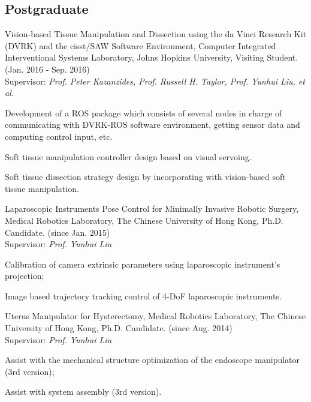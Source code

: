 \documentclass[10pt,letterpaper]{article}
\renewenvironment{itemize}{
  \begin{list}{}{
    \setlength{\leftmargin}{1.5em}
    \setlength{\itemsep}{0.25em}
    \setlength{\parskip}{0pt}
    \setlength{\parsep}{0.25em}
  }
}{
  \end{list}
}
\begin{document}
\subsection*{Postgraduate}
\begin{itemize}
\item Vision-based Tissue Manipulation and Dissection using the da Vinci Research Kit (DVRK) and the cisst/SAW Software Environment, Computer Integrated Interventional Systems Laboratory, Johns Hopkins University, Visiting Student. (Jan. 2016 - Sep. 2016) \\
  Supervisor: \textit{Prof. Peter Kazanzides, Prof. Russell H. Taylor, Prof. Yunhui Liu, et al.}
  \begin{itemize}
  \item Development of a ROS package which consists of several nodes in charge of communicating with DVRK-ROS software environment, getting sensor data and computing control input, etc.
  \item Soft tissue manipulation controller design based on visual servoing.
  \item Soft tissue dissection strategy design by incorporating with vision-based soft tissue manipulation. 
  \end{itemize}

\item Laparoscopic Instruments Pose Control for Minimally Invasive Robotic Surgery, Medical Robotics Laboratory, The Chinese University of Hong Kong, Ph.D. Candidate. (since Jan. 2015) \\
  Supervisor: \textit{Prof. Yunhui Liu}
  \begin{itemize}
  \item Calibration of camera extrinsic parameters using laparoscopic instrument's projection;
  \item Image based trajectory tracking control of 4-DoF laparoscopic instruments.
  \end{itemize}

\item Uterus Manipulator for Hysterectomy, Medical Robotics Laboratory, The Chinese University of Hong Kong, Ph.D. Candidate. (since Aug. 2014) \\
  Supervisor: \textit{Prof. Yunhui Liu}
  \begin{itemize}
  \item Assist with the mechanical structure optimization of the endoscope manipulator (3rd version);
  \item Assist with system assembly (3rd version).
  \end{itemize}


\end{itemize}
\end{document}
